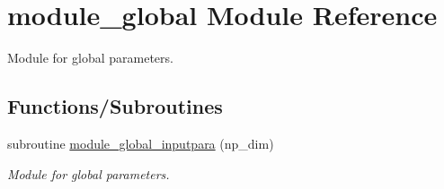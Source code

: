 \hypertarget{namespacemodule__global}{}\section{module\+\_\+global Module Reference}
\label{namespacemodule__global}


Module for global parameters.  


\subsection*{Functions/\+Subroutines}
\begin{DoxyCompactItemize}
\item 
subroutine \mbox{\hyperlink{namespacemodule__global_a74cb46a87131e7b91b464cd2a2c480d2}{module\+\_\+global\+\_\+inputpara}} (np\+\_\+dim)
\begin{DoxyCompactList}\small\item\em Module for global parameters. \end{DoxyCompactList}\end{DoxyCompactItemize}
